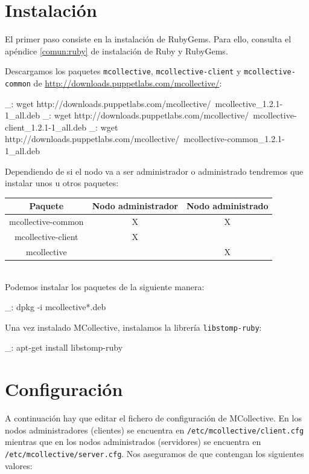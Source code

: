\section{Instalación}

El primer paso consiste en la instalación de RubyGems. Para ello, consulta el apéndice \ref{comun:ruby} de instalación de Ruby y RubyGems.

Descargamos los paquetes \texttt{mcollective}, \texttt{mcollective-client} y \texttt{mcollective-common} de \url{http://downloads.puppetlabs.com/mcollective/}:

\begin{bashcode}
_: wget http://downloads.puppetlabs.com/mcollective/\
mcollective_1.2.1-1_all.deb
_: wget http://downloads.puppetlabs.com/mcollective/\
mcollective-client_1.2.1-1_all.deb
_: wget http://downloads.puppetlabs.com/mcollective/\
mcollective-common_1.2.1-1_all.deb
\end{bashcode}

Dependiendo de si el nodo va a ser administrador o administrado tendremos que instalar unos u otros paquetes:

\begin{tabular}{|c|c|c|}
   \hline
   Paquete & Nodo administrador & Nodo administrado \\ \hline
   mcollective-common & X & X \\ \hline
   mcollective-client & X &   \\ \hline
   mcollective &  & X \\ \hline
\end{tabular}
\\

Podemos instalar los paquetes de la siguiente manera:

\begin{bashcode}
_: dpkg -i mcollective*.deb
\end{bashcode}

Una vez instalado MCollective, instalamos la librería \texttt{libstomp-ruby}:

\begin{bashcode}
_: apt-get install libstomp-ruby
\end{bashcode}


\section{Configuración}

A continuación hay que editar el fichero de configuración de MCollective. En los nodos administradores (clientes) se encuentra en \texttt{/etc/mcollective/client.cfg} mientras que en los nodos administrados (servidores) se encuentra en \texttt{/etc/mcollective/server.cfg}. Nos aseguramos de que contengan los siguientes valores:

